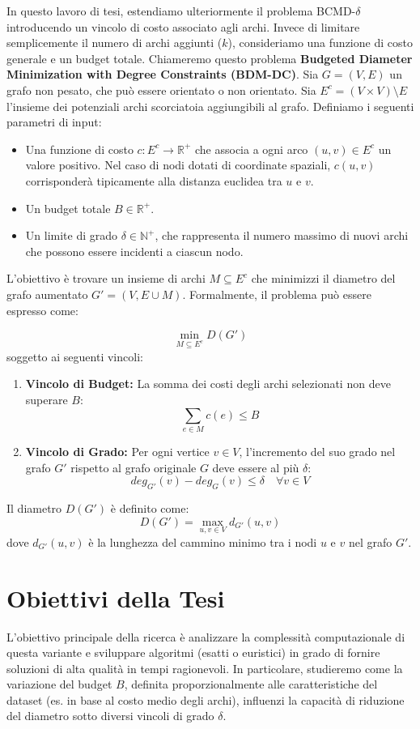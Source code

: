 In questo lavoro di tesi, estendiamo ulteriormente il problema BCMD-$\delta$ introducendo un vincolo di costo associato agli archi.
Invece di limitare semplicemente il numero di archi aggiunti ($k$), consideriamo una funzione di costo generale e un budget totale.
Chiameremo questo problema \textbf{Budgeted Diameter Minimization with Degree Constraints (BDM-DC)}.
Sia $G = (V, E)$ un grafo non pesato, che può essere orientato o non orientato. Sia $E^c = (V \times V) \setminus E$ 
l'insieme dei potenziali archi scorciatoia aggiungibili al grafo. 
Definiamo i seguenti parametri di input:
\begin{itemize}
    \item Una funzione di costo $c: E^c \to \mathbb{R}^+$ che associa a ogni arco $(u, v) \in E^c$ un valore positivo.
    Nel caso di nodi dotati di coordinate spaziali, $c(u, v)$ corrisponderà tipicamente alla distanza euclidea tra $u$ e $v$.
    \item Un budget totale $B \in \mathbb{R}^+$.
    \item Un limite di grado $\delta \in \mathbb{N}^+$,
    che rappresenta il numero massimo di nuovi archi che possono essere incidenti a ciascun nodo.
\end{itemize}
L'obiettivo è trovare un insieme di archi $M \subseteq E^c$ che minimizzi il diametro del grafo aumentato $G' = (V, E \cup M)$. Formalmente, il problema può essere espresso come:

$$ \min_{M \subseteq E^c} D(G') $$
soggetto ai seguenti vincoli:

\begin{enumerate}
    \item \textbf{Vincolo di Budget:} La somma dei costi degli archi selezionati non deve superare $B$:
    $$ \sum_{e \in M} c(e) \le B $$
    
    \item \textbf{Vincolo di Grado:} Per ogni vertice $v \in V$, l'incremento del suo grado nel grafo $G'$ rispetto al grafo originale $G$ deve essere al più $\delta$:
    $$ deg_{G'}(v) - deg_G(v) \le \delta \quad \forall v \in V $$
\end{enumerate}
Il diametro $D(G')$ è definito come:
$$ D(G') = \max_{u, v \in V} d_{G'}(u, v) $$ 
dove $d_{G'}(u, v)$ è la lunghezza del cammino minimo tra i nodi $u$ e $v$ nel grafo $G'$.

\section{Obiettivi della Tesi}

L'obiettivo principale della ricerca è analizzare la complessità computazionale di questa variante e sviluppare algoritmi (esatti o euristici)
in grado di fornire soluzioni di alta qualità in tempi ragionevoli. In particolare, studieremo come la variazione del budget $B$,
definita proporzionalmente alle caratteristiche del dataset (es. in base al costo medio degli archi), influenzi la capacità di riduzione del 
diametro sotto diversi vincoli di grado $\delta$.